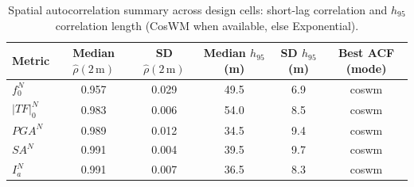 \begin{table}[!ht]
\caption{Spatial autocorrelation summary across design cells: short-lag correlation and $h_{95}$ correlation length (CosWM when available, else Exponential).\label{tab:acf_summary}}
\begin{tabular*}{\textwidth}{@{\extracolsep{\fill}}lccccc@{}}
\toprule
Metric & Median $\hat\rho(2\,\mathrm{m})$ & SD $\hat\rho(2\,\mathrm{m})$ & Median $h_{95}$ (m) & SD $h_{95}$ (m) & Best ACF (mode) \\
\midrule
$f_0^N$ & 0.957 & 0.029 & 49.5 & 6.9 & coswm \\
$\lvert TF\rvert_0^N$ & 0.983 & 0.006 & 54.0 & 8.5 & coswm \\
$PGA^N$ & 0.989 & 0.012 & 34.5 & 9.4 & coswm \\
$SA^N$ & 0.991 & 0.004 & 39.5 & 9.7 & coswm \\
$I_a^N$ & 0.991 & 0.007 & 36.5 & 8.3 & coswm \\
\bottomrule
\end{tabular*}
\end{table}

